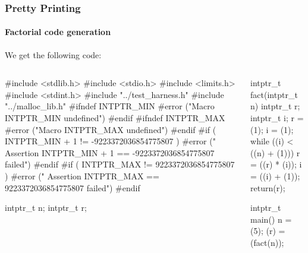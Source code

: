 \begin{frame}[fragile]
\frametitle{Pretty Printing}
\framesubtitle{Factorial code generation}
\Fontvi

We get the following code:

\begin{columns}[t]
\begin{semiverbatim}
\alert<2>{#include <stdlib.h>}
\alert<2>{#include <stdio.h>}
\alert<2>{#include <limits.h>}
\alert<2>{#include <stdint.h>}
\alert<2>{#include "../test_harness.h"}
\alert<2>{#include "../malloc_lib.h"}
\alert<3>{#ifndef INTPTR_MIN}
  \alert<3>{#error ("Macro INTPTR_MIN undefined")}
\alert<3>{#endif}
\alert<3>{#ifndef INTPTR_MAX}
  \alert<3>{#error ("Macro INTPTR_MAX undefined")}
\alert<3>{#endif}
\alert<3>{#if ( INTPTR_MIN + 1 != -9223372036854775807 )}
  \alert<3>{#error (" Assertion INTPTR_MIN + 1 == -9223372036854775807 failed")}
\alert<3>{#endif}
\alert<3>{#if ( INTPTR_MAX != 9223372036854775807 )}
  \alert<3>{#error (" Assertion INTPTR_MAX == 9223372036854775807 failed")}
\alert<3>{#endif}


\alert<4>{intptr_t n;}
\alert<4>{intptr_t r;}
\end{semiverbatim}
\begin{semiverbatim}
\alert<5>{intptr_t fact(intptr_t n) {}
\alert<5>{  intptr_t r;}
\alert<5>{  intptr_t i;}
\alert<5>{  r = (1);}
\alert<5>{  i = (1);}
\alert<5>{  while ((i) < ((n) + (1))) {}
\alert<5>{    r = ((r) * (i));}
\alert<5>{    i = ((i) + (1));}
\alert<5>{  }}
\alert<5>{  return(r);}
\alert<5>{}}

\alert<6>{intptr_t main() {}
\alert<6>{  n = (5);}
\alert<6>{  (r) = (fact(n));}
\alert<6>{}}
\end{semiverbatim}
\end{columns}


\end{frame}


